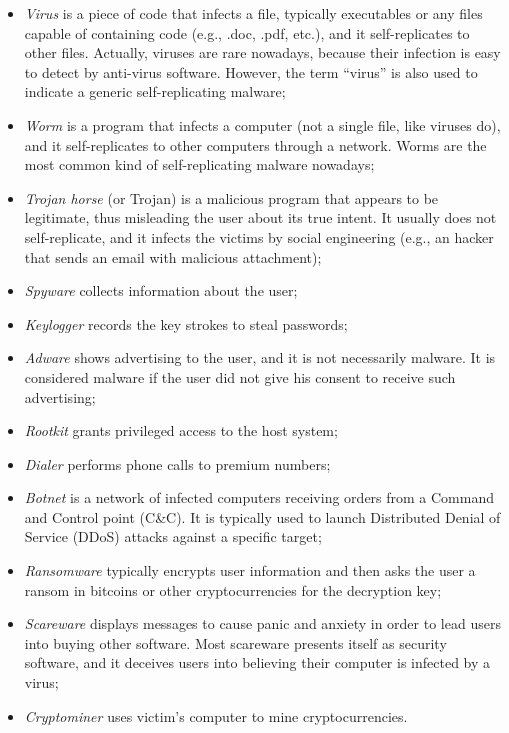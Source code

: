 \documentclass[a4paper,12pt]{article}
\begin{document}
\begin{itemize}
	\item \textit{Virus} is a piece of code that infects a file, typically executables or any files capable of containing code (e.g., .doc, .pdf, etc.), and it self-replicates to other files. Actually, viruses are rare nowadays, because their infection is easy to detect by anti-virus software. However, the term “virus” is also used to indicate a generic self-replicating malware;
	\item \textit{Worm} is a program that infects a computer (not a single file, like viruses do), and it self-replicates to other computers through a network. Worms are the most common kind of self-replicating malware nowadays;
	\item \textit{Trojan horse} (or Trojan) is a malicious program that appears to be legitimate, thus misleading the user about its true intent. It usually does not self-replicate, and it infects the victims by social engineering (e.g., an hacker that sends an email with malicious attachment);
	\item \textit{Spyware} collects information about the user;
	\item \textit{Keylogger} records the key strokes to steal passwords;
	\item \textit{Adware} shows advertising to the user, and it is not necessarily malware. It is considered malware if the user did not give his consent to receive such advertising;
	\item \textit{Rootkit} grants privileged access to the host system;
	\item \textit{Dialer} performs phone calls to premium numbers;
	\item \textit{Botnet} is a network of infected computers receiving orders from a Command and Control point (C\&C). It is typically used to launch Distributed Denial of Service (DDoS) attacks against a specific target;
	\item \textit{Ransomware} typically encrypts user information and then asks the user a ransom in bitcoins or other cryptocurrencies for the decryption key;
	\item \textit{Scareware} displays messages to cause panic and anxiety in order to lead users into buying other software. Most scareware presents itself as security software, and it deceives users into believing their computer is infected by a virus;
	\item \textit{Cryptominer} uses victim's computer to mine cryptocurrencies.
\end{itemize}
\end{document}
